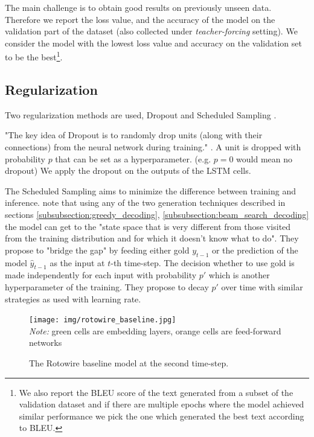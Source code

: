 The main challenge is to obtain good results on previously unseen data. Therefore we report the loss value, and the accuracy of the model on the validation part of the dataset (also collected under \emph{teacher-forcing} setting). We consider the model with the lowest loss value and accuracy on the validation set to be the best\footnote{We also report the BLEU score \citep{papineni2002} of the text generated from a subset of the validation dataset and if there are multiple epochs where the model achieved similar performance we pick the one which generated the best text according to BLEU.}.

\subsection{Regularization}

Two regularization methods are used, Dropout and Scheduled Sampling \citep{bengio2015scheduled}.

"The key idea of Dropout is to randomly drop units (along with their connections) from the neural network during training." \citep{srivastavaDropout2014}. A unit is dropped with probability $p$ that can be set as a hyperparameter. (e.g. $p = 0$ would mean no dropout)  We apply the dropout on the outputs of the LSTM cells.

The Scheduled Sampling aims to minimize the difference between training and inference. \citet{bengio2015scheduled} note that using any of the two generation techniques described in sections \ref{subsubsection:greedy_decoding}, \ref{subsubsection:beam_search_decoding} the model can get to the "state space that is very different from those visited from the training distribution and for which it doesn’t know what to do". They propose to "bridge the gap" by feeding either gold $y_{t-1}$ or the prediction of the model $\hat{y}_{t-1}$ as the input at $t$-th time-step. The decision whether to use gold is made independently for each input with probability $p'$ which is another hyperparameter of the training. They propose to decay $p'$ over time with similar strategies as used with learning rate.

\begin{figure}[!h]
    \centering
    \texttt{[image: img/rotowire\_baseline.jpg]}
    \footnotesize{\\ \textit{Note:} green cells are embedding layers, orange cells are feed-forward networks}
    \caption{\centering The Rotowire baseline model at the second time-step.} \label{figure:basline_model_visualization}
\end{figure}

